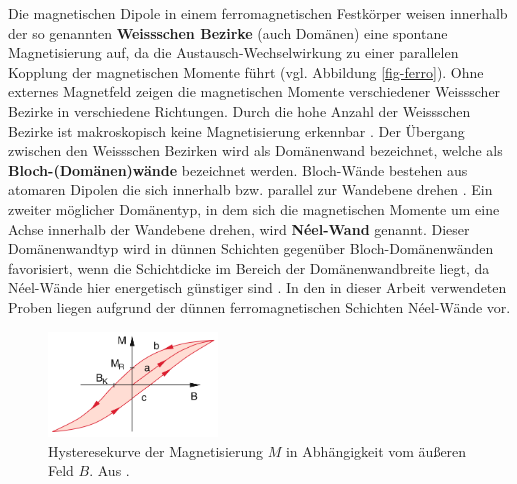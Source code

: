 \documentclass[page,pdftex,12pt,a4paper,twoside,openright]{scrbook}
\begin{document}
Die magnetischen Dipole in einem ferromagnetischen Festkörper weisen innerhalb der so genannten \textbf{Weissschen Bezirke} (auch Domänen) eine spontane Magnetisierung auf, da die Austausch-Wechselwirkung zu einer parallelen Kopplung der magnetischen Momente führt (vgl. Abbildung \ref{fig-ferro}). Ohne externes Magnetfeld zeigen die magnetischen Momente verschiedener Weissscher Bezirke in verschiedene Richtungen. Durch die hohe Anzahl der Weissschen Bezirke ist makroskopisch keine Magnetisierung erkennbar \cite{rybach_physik_2008}. Der Übergang zwischen den Weissschen Bezirken wird als Domänenwand bezeichnet, welche als \textbf{Bloch-(Domänen)wände} bezeichnet werden. Bloch-Wände bestehen aus atomaren Dipolen die sich innerhalb bzw. parallel zur Wandebene drehen \cite{gross_festkorperphysik_2012}. Ein zweiter möglicher Domänentyp, in dem sich die magnetischen Momente um eine Achse innerhalb der Wandebene drehen, wird \textbf{Néel-Wand} genannt. Dieser Domänenwandtyp wird in dünnen Schichten gegenüber Bloch-Domänenwänden favorisiert, wenn die Schichtdicke im Bereich der Domänenwandbreite liegt, da Néel-Wände hier energetisch günstiger sind \cite{hubert_magnetic_2008}. In den in dieser Arbeit verwendeten Proben liegen aufgrund der dünnen ferromagnetischen Schichten Néel-Wände vor. 

\begin{figure}[h]
\centering
\includegraphics[width=0.4\textwidth]{img/hysterese.png}
\caption{\label{fig-hysterese}
Hysteresekurve der Magnetisierung \(M\) in Abhängigkeit vom äußeren Feld \(B\). Aus \cite{demtroder_experimentalphysik_2017}.}
\end{figure}
\end{document}
